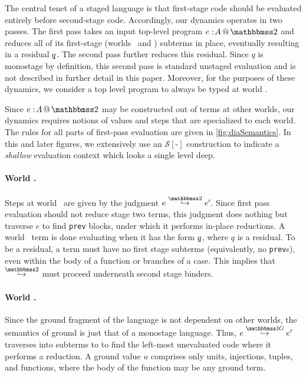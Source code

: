 
\begin{abstrsyn}
The central tenet of a staged language
is that first-stage code should be evaluated entirely before second-stage code.
Accordingly, our dynamics operates in two passes.
The first pass takes an input top-level program $\coltwo e A$
and reduces all of its first-stage (worlds \bbonem\ and \bbonep) subterms in place,
eventually resulting in a residual $\underline{\smash{q}}$.
The second pass further reduces this residual.
Since $q$ is monostage by definition, this second pass is standard unstaged evaluation
and is not described in further detail in this paper.
Moreover, for the purposes of these dynamics, we consider a top level program to always be typed at world \bbtwo.

Since $\coltwo e A$ may be constructed out of terms at other worlds, 
our dynamics requires notions of values and steps that are specialized to each world.
The rules for all parts of first-pass evaluation are given in \ref{fig:diaSemantics}.
In this and later figures, we extensively use an $\mathcal{S}[\text{-}]$ construction
to indicate a \emph{shallow} evaluation context which looks a single level deep.

\paragraph{World \bbtwo.} Steps at world \bbtwo\ are given by the judgment \mbox{$\steptwo e {e'}$}.
Since first pass evaluation should not reduce stage two terms, this judgment does nothing but traverse $e$ to find {\tt prev} blocks, under which it performs in-place reductions.
A world \bbtwo\ term is done evaluating when it has the form $\underline{\smash{q}}$, where $q$ is a residual. 
To be a residual, a term must have no first stage subterms (equivalently, no {\tt prev}s), even within the body of a function or branches of a case.
This implies that $\stepsym \bbtwo$ must proceed underneath second stage binders.

\paragraph{World \bbonep.} Since the ground fragment of the language is not dependent on other worlds, the semantics of ground is just that of a monostage language.
Thus, $\steppure e {e'}$ traverses into subterms to to find the left-most unevaluated code where it performs a reduction. 
A ground value $u$ comprises only units, injections, tuples, and functions, where the body of the function may be any ground term.


\end{abstrsyn}
